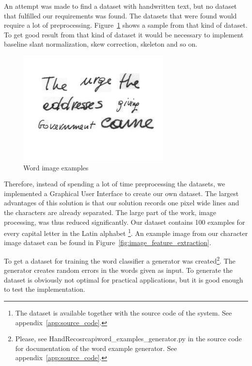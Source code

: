 
An attempt was made to find a dataset with handwritten text, but no dataset that fulfilled our requirements was found.
The datasets that were found would require a lot of preprocessing. 
Figure~\ref{figure:wordsexamples} shows a sample from that kind of dataset.
To get good result from that kind of dataset it would be necessary to implement baseline slant normalization, skew correction, skeleton and so on.

\begin{figure}[h!]
\centering
 \includegraphics[width=3in]{datasets_examples}
\caption{Word image examples}
\label{figure:wordsexamples}
\end{figure}

Therefore, instead of spending a lot of time preprocessing the datasets, we implemented a Graphical User Interface to create our own dataset.
The largest advantages of this solution is that our solution records one pixel wide lines and the characters are already separated. 
The large part of the work, image processing, was thus reduced significantly.
Our dataset contains 100 examples for every capital letter in the Latin alphabet
\footnote{The dataset is available together with the source code of the system. See appendix~\ref{app:source_code}.}.
An example image from our character image dataset can be found in Figure~\ref{fig:image_feature_extraction}.

To get a dataset for training the word classifier a generator was created\footnote{Please, see HandReco\/src\/api\/word\_examples\_generator.py in the source code for documentation of the word example generator. See appendix~\ref{app:source_code}.}.
The generator creates random errors in the words given as input.
To generate the dataset is obviously not optimal for practical applications, but it is good enough to test the implementation.
